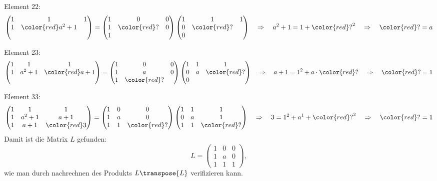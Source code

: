 \begin{loesung}
Element 22:
\[
\begin{pmatrix}
1&               1&1\\
1&\color{red}a^2+1& \\
 &                &
\end{pmatrix}
=
\begin{pmatrix}
1&           0&0\\
1&\color{red}?&0\\
1&            &
\end{pmatrix}
\begin{pmatrix}
1&           1&1\\
0&\color{red}?& \\
0&            &
\end{pmatrix}
\quad\Rightarrow\quad
a^2+1=1+ {\color{red}?}^2
\quad\Rightarrow\quad
{\color{red}?}=a
\]

Element 23:
\[
\begin{pmatrix}
1&1&1\\
1&a^2+1&\color{red}a+1\\
 &     &
\end{pmatrix}
=
\begin{pmatrix}
1&0&0\\
1&a&0\\
1&\color{red}?&
\end{pmatrix}
\begin{pmatrix}
1&1&1\\
0&a&\color{red}?\\
0& &
\end{pmatrix}
\quad\Rightarrow\quad
a+1= 1^2 + a\cdot{\color{red}?}
\quad\Rightarrow\quad
{\color{red}?}=1
\]

Element 33:
\[
\begin{pmatrix}
1&1&1\\
1&a^2+1&a+1\\
1&a+1&\color{red}3
\end{pmatrix}
=
\begin{pmatrix}
1&0&0\\
1&a&0\\
1&1&\color{red}?
\end{pmatrix}
\begin{pmatrix}
1&1&1\\
0&a&1\\
1&1&\color{red}?
\end{pmatrix}
\quad\Rightarrow\quad
3=1^2+a^1+{\color{red}?}^2
\quad\Rightarrow\quad
{\color{red}?}=1
\]
Damit ist die Matrix $L$ gefunden:
\[
L=\begin{pmatrix}
1&0&0\\
1&a&0\\
1&1&1
\end{pmatrix},
\]
wie man durch nachrechnen des Produkts $L\transpose{L}$ verifizieren kann.
\end{loesung}

